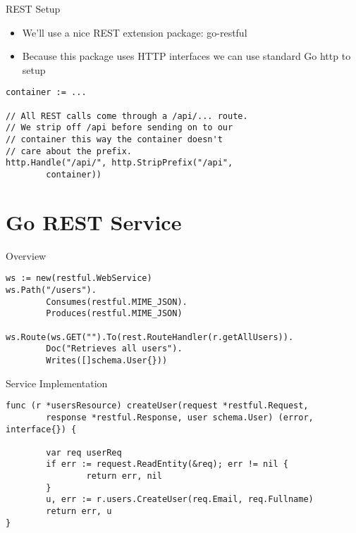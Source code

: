 \documentclass[presentation]{beamer}
\begin{document}
\begin{frame}[fragile,label=sec-6-3]{REST Setup}
 \begin{itemize}
\item We'll use a nice REST extension package: go-restful
\item Because this package uses HTTP interfaces we can use standard Go http to setup
\end{itemize}
\begin{verbatim}
container := ...

// All REST calls come through a /api/... route.
// We strip off /api before sending on to our
// container this way the container doesn't
// care about the prefix.
http.Handle("/api/", http.StripPrefix("/api",
        container))
\end{verbatim}
\end{frame}

\section{Go REST Service}
\label{sec-7}
\begin{frame}[fragile,label=sec-7-1]{Overview}
 \begin{verbatim}
ws := new(restful.WebService)
ws.Path("/users").
        Consumes(restful.MIME_JSON).
        Produces(restful.MIME_JSON)

ws.Route(ws.GET("").To(rest.RouteHandler(r.getAllUsers)).
        Doc("Retrieves all users").
        Writes([]schema.User{}))
\end{verbatim}
\end{frame}

\begin{frame}[fragile,label=sec-7-2]{Service Implementation}
 \begin{verbatim}
func (r *usersResource) createUser(request *restful.Request,
        response *restful.Response, user schema.User) (error, interface{}) {

        var req userReq
        if err := request.ReadEntity(&req); err != nil {
                return err, nil
        }
        u, err := r.users.CreateUser(req.Email, req.Fullname)
        return err, u
}
\end{verbatim}
\end{frame}
\end{document}
